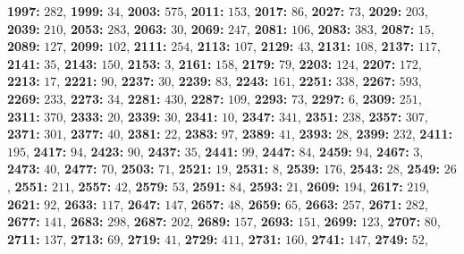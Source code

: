 \textsf{\bfseries 1997:} $282$, \textsf{\bfseries 1999:} $34$, \textsf{\bfseries 2003:} $575$, \textsf{\bfseries 2011:} $153$, \textsf{\bfseries 2017:} $86$, \textsf{\bfseries 2027:} $73$, \textsf{\bfseries 2029:} $203$, \textsf{\bfseries 2039:} $210$, \textsf{\bfseries 2053:} $283$, \textsf{\bfseries 2063:} $30$, \textsf{\bfseries 2069:} $247$, \textsf{\bfseries 2081:} $106$, \textsf{\bfseries 2083:} $383$, \textsf{\bfseries 2087:} $15$, \textsf{\bfseries 2089:} $127$, \textsf{\bfseries 2099:} $102$, \textsf{\bfseries 2111:} $254$, \textsf{\bfseries 2113:} $107$, \textsf{\bfseries 2129:} $43$, \textsf{\bfseries 2131:} $108$, \textsf{\bfseries 2137:} $117$, \textsf{\bfseries 2141:} $35$, \textsf{\bfseries 2143:} $150$, \textsf{\bfseries 2153:} $3$, \textsf{\bfseries 2161:} $158$, \textsf{\bfseries 2179:} $79$, \textsf{\bfseries 2203:} $124$, \textsf{\bfseries 2207:} $172$, \textsf{\bfseries 2213:} $17$, \textsf{\bfseries 2221:} $90$, \textsf{\bfseries 2237:} $30$, \textsf{\bfseries 2239:} $83$, \textsf{\bfseries 2243:} $161$, \textsf{\bfseries 2251:} $338$, \textsf{\bfseries 2267:} $593$, \textsf{\bfseries 2269:} $233$, \textsf{\bfseries 2273:} $34$, \textsf{\bfseries 2281:} $430$, \textsf{\bfseries 2287:} $109$, \textsf{\bfseries 2293:} $73$, \textsf{\bfseries 2297:} $6$, \textsf{\bfseries 2309:} $251$, \textsf{\bfseries 2311:} $370$, \textsf{\bfseries 2333:} $20$, \textsf{\bfseries 2339:} $30$, \textsf{\bfseries 2341:} $10$, \textsf{\bfseries 2347:} $341$, \textsf{\bfseries 2351:} $238$, \textsf{\bfseries 2357:} $307$, \textsf{\bfseries 2371:} $301$, \textsf{\bfseries 2377:} $40$, \textsf{\bfseries 2381:} $22$, \textsf{\bfseries 2383:} $97$, \textsf{\bfseries 2389:} $41$, \textsf{\bfseries 2393:} $28$, \textsf{\bfseries 2399:} $232$, \textsf{\bfseries 2411:} $195$, \textsf{\bfseries 2417:} $94$, \textsf{\bfseries 2423:} $90$, \textsf{\bfseries 2437:} $35$, \textsf{\bfseries 2441:} $99$, \textsf{\bfseries 2447:} $84$, \textsf{\bfseries 2459:} $94$, \textsf{\bfseries 2467:} $3$, \textsf{\bfseries 2473:} $40$, \textsf{\bfseries 2477:} $70$, \textsf{\bfseries 2503:} $71$, \textsf{\bfseries 2521:} $19$, \textsf{\bfseries 2531:} $8$, \textsf{\bfseries 2539:} $176$, \textsf{\bfseries 2543:} $28$, \textsf{\bfseries 2549:} $26$, \textsf{\bfseries 2551:} $211$, \textsf{\bfseries 2557:} $42$, \textsf{\bfseries 2579:} $53$, \textsf{\bfseries 2591:} $84$, \textsf{\bfseries 2593:} $21$, \textsf{\bfseries 2609:} $194$, \textsf{\bfseries 2617:} $219$, \textsf{\bfseries 2621:} $92$, \textsf{\bfseries 2633:} $117$, \textsf{\bfseries 2647:} $147$, \textsf{\bfseries 2657:} $48$, \textsf{\bfseries 2659:} $65$, \textsf{\bfseries 2663:} $257$, \textsf{\bfseries 2671:} $282$, \textsf{\bfseries 2677:} $141$, \textsf{\bfseries 2683:} $298$, \textsf{\bfseries 2687:} $202$, \textsf{\bfseries 2689:} $157$, \textsf{\bfseries 2693:} $151$, \textsf{\bfseries 2699:} $123$, \textsf{\bfseries 2707:} $80$, \textsf{\bfseries 2711:} $137$, \textsf{\bfseries 2713:} $69$, \textsf{\bfseries 2719:} $41$, \textsf{\bfseries 2729:} $411$, \textsf{\bfseries 2731:} $160$, \textsf{\bfseries 2741:} $147$, \textsf{\bfseries 2749:} $52$, 
